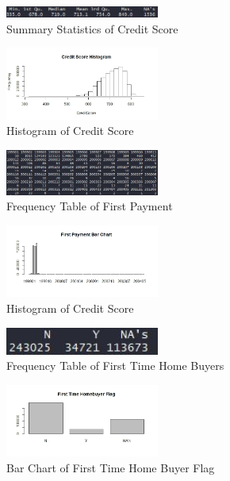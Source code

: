 \documentclass[10pt,twocolumn,letterpaper]{article}
\begin{document}

\begin{figure}
	\includegraphics[width=0.45\textwidth]{images/CreditScoreSummary.JPG}
	\caption{Summary Statistics of Credit Score}
	\label{fig:CreditScoreSummary}
\end{figure}
\begin{figure}
	\includegraphics[width=0.45\textwidth]{images/CreditScoreHist.jpeg}
	\caption{Histogram of Credit Score}
	\label{fig:CreditScoreHist}
\end{figure}

\begin{figure}
	\includegraphics[width=0.45\textwidth]{images/FirstPaymentSummary.JPG}
	\caption{Frequency Table of First Payment}
	\label{fig:FirstPaymentS}
\end{figure}
\begin{figure}
	\includegraphics[width=0.45\textwidth]{images/FirstPaymentBarChart.jpeg}
	\caption{Histogram of Credit Score}
	\label{fig:FirstPaymentB}
\end{figure}

\begin{figure}
	\includegraphics[width=0.45\textwidth]{images/FirstTimeHomeS.JPG}
	\caption{Frequency Table of First Time Home Buyers}
	\label{fig:FirstTimeHomeS}
\end{figure}
\begin{figure}
	\includegraphics[width=0.45\textwidth]{images/FirstTimeHomeB.jpeg}
	\caption{Bar Chart of First Time Home Buyer Flag}
	\label{fig:FirstTimeHomeB}
\end{figure}
\end{document}
